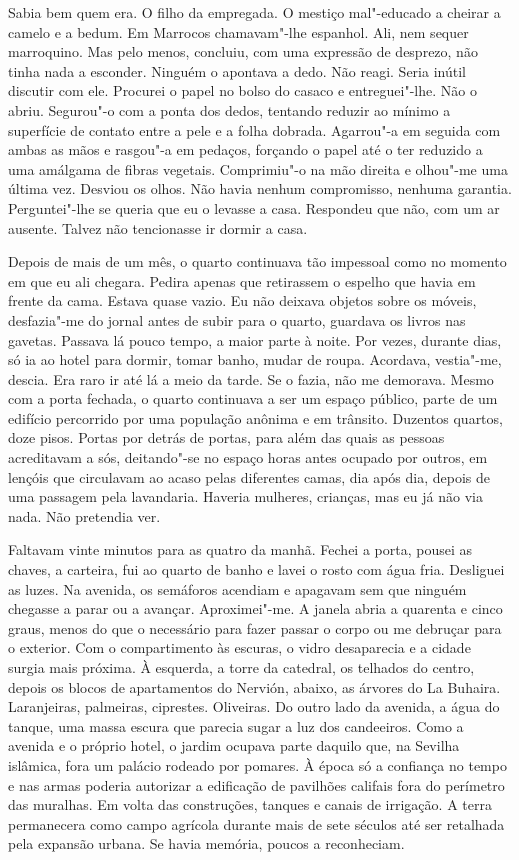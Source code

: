 Sabia bem quem era. O filho da empregada. O mestiço mal"-educado a
cheirar a camelo e a bedum. Em Marrocos chamavam"-lhe espanhol. Ali, nem
sequer marroquino. Mas pelo menos, concluiu, com uma expressão de
desprezo, não tinha nada a esconder. Ninguém o apontava a dedo. Não
reagi. Seria inútil discutir com ele. Procurei o papel no bolso do
casaco e entreguei"-lhe. Não o abriu. Segurou"-o com a ponta dos dedos,
tentando reduzir ao mínimo a superfície de contato entre a pele e a
folha dobrada. Agarrou"-a em seguida com ambas as mãos e rasgou"-a em
pedaços, forçando o papel até o ter reduzido a uma amálgama de fibras
vegetais. Comprimiu"-o na mão direita e olhou"-me uma última vez.
Desviou os olhos. Não havia nenhum compromisso, nenhuma garantia.
Perguntei"-lhe se queria que eu o levasse a casa. Respondeu que não, com
um ar ausente. Talvez não tencionasse ir dormir a casa.

Depois de mais de um mês, o quarto continuava tão impessoal como no
momento em que eu ali chegara. Pedira apenas que retirassem o espelho
que havia em frente da cama. Estava quase vazio. Eu não deixava objetos
sobre os móveis, desfazia"-me do jornal antes de subir para o quarto,
guardava os livros nas gavetas. Passava lá pouco tempo, a maior parte à
noite. Por vezes, durante dias, só ia ao hotel para dormir, tomar banho,
mudar de roupa. Acordava, vestia"-me, descia. Era raro ir até lá a meio
da tarde. Se o fazia, não me demorava. Mesmo com a porta fechada, o
quarto continuava a ser um espaço público, parte de um edifício
percorrido por uma população anônima e em trânsito. Duzentos quartos,
doze pisos. Portas por detrás de portas, para além das quais as pessoas
acreditavam a sós, deitando"-se no espaço horas antes ocupado por
outros, em lençóis que circulavam ao acaso pelas diferentes camas, dia
após dia, depois de uma passagem pela lavandaria. Haveria mulheres,
crianças, mas eu já não via nada. Não pretendia ver.

Faltavam vinte minutos para as quatro da manhã. Fechei a porta, pousei
as chaves, a carteira, fui ao quarto de banho e lavei o rosto com água
fria. Desliguei as luzes. Na avenida, os semáforos acendiam e apagavam
sem que ninguém chegasse a parar ou a avançar. Aproximei"-me. A janela
abria a quarenta e cinco graus, menos do que o necessário para fazer
passar o corpo ou me debruçar para o exterior. Com o compartimento às
escuras, o vidro desaparecia e a cidade surgia mais próxima. À esquerda,
a torre da catedral, os telhados do centro, depois os blocos de
apartamentos do Nervión, abaixo, as árvores do La Buhaira. Laranjeiras,
palmeiras, ciprestes. Oliveiras. Do outro lado da avenida, a água do
tanque, uma massa escura que parecia sugar a luz dos candeeiros. Como a
avenida e o próprio hotel, o jardim ocupava parte daquilo que, na
Sevilha islâmica, fora um palácio rodeado por pomares. À época só a
confiança no tempo e nas armas poderia autorizar a edificação de
pavilhões califais fora do perímetro das muralhas. Em volta das
construções, tanques e canais de irrigação. A terra permanecera como
campo agrícola durante mais de sete séculos até ser retalhada pela
expansão urbana. Se havia memória, poucos a reconheciam.


